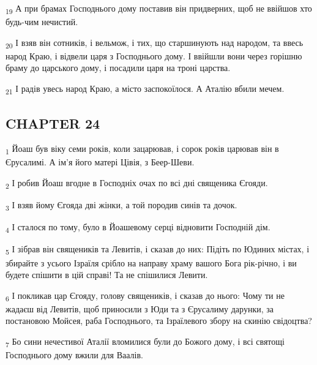 \begin{tcolorbox}
\textsubscript{19} А при брамах Господнього дому поставив він придверних, щоб не ввійшов хто будь-чим нечистий.
\end{tcolorbox}
\begin{tcolorbox}
\textsubscript{20} І взяв він сотників, і вельмож, і тих, що старшинують над народом, та ввесь народ Краю, і відвели царя з Господнього дому. І ввійшли вони через горішню браму до царського дому, і посадили царя на троні царства.
\end{tcolorbox}
\begin{tcolorbox}
\textsubscript{21} І радів увесь народ Краю, а місто заспокоїлося. А Аталію вбили мечем.
\end{tcolorbox}
\subsection{CHAPTER 24}
\begin{tcolorbox}
\textsubscript{1} Йоаш був віку семи років, коли зацарював, і сорок років царював він в Єрусалимі. А ім'я його матері Цівія, з Беер-Шеви.
\end{tcolorbox}
\begin{tcolorbox}
\textsubscript{2} І робив Йоаш вгодне в Господніх очах по всі дні священика Єгояди.
\end{tcolorbox}
\begin{tcolorbox}
\textsubscript{3} І взяв йому Єгояда дві жінки, а той породив синів та дочок.
\end{tcolorbox}
\begin{tcolorbox}
\textsubscript{4} І сталося по тому, було в Йоашевому серці відновити Господній дім.
\end{tcolorbox}
\begin{tcolorbox}
\textsubscript{5} І зібрав він священиків та Левитів, і сказав до них: Підіть по Юдиних містах, і збирайте з усього Ізраїля срібло на направу храму вашого Бога рік-річно, і ви будете спішити в цій справі! Та не спішилися Левити.
\end{tcolorbox}
\begin{tcolorbox}
\textsubscript{6} І покликав цар Єгояду, голову священиків, і сказав до нього: Чому ти не жадаєш від Левитів, щоб приносили з Юди та з Єрусалиму дарунки, за постановою Мойсея, раба Господнього, та Ізраїлевого збору на скинію свідоцтва?
\end{tcolorbox}
\begin{tcolorbox}
\textsubscript{7} Бо сини нечестивої Аталії вломилися були до Божого дому, і всі святощі Господнього дому вжили для Ваалів.
\end{tcolorbox}
